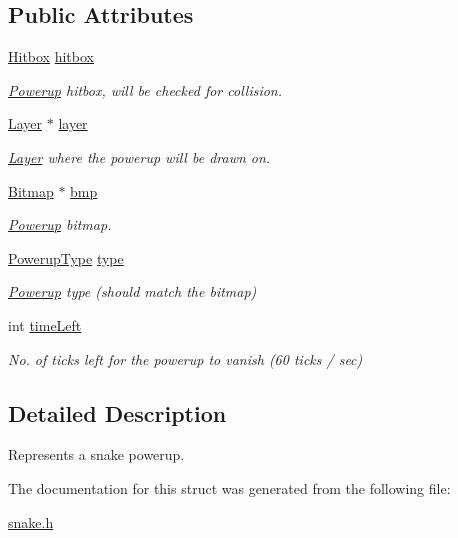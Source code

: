 \subsection*{Public Attributes}
\begin{DoxyCompactItemize}
\item 
\mbox{\hyperlink{struct_hitbox}{Hitbox}} \mbox{\hyperlink{group__snake_ga0ec1e0954c1802c16b49ff5833146f32}{hitbox}}
\begin{DoxyCompactList}\small\item\em \mbox{\hyperlink{struct_powerup}{Powerup}} hitbox, will be checked for collision. \end{DoxyCompactList}\item 
\mbox{\hyperlink{struct_layer}{Layer}} $\ast$ \mbox{\hyperlink{group__snake_ga02754983ce605c249985e650d5023797}{layer}}
\begin{DoxyCompactList}\small\item\em \mbox{\hyperlink{struct_layer}{Layer}} where the powerup will be drawn on. \end{DoxyCompactList}\item 
\mbox{\hyperlink{struct_bitmap}{Bitmap}} $\ast$ \mbox{\hyperlink{group__snake_ga13efa83c1c0242d50ed4a18a6cdc77af}{bmp}}
\begin{DoxyCompactList}\small\item\em \mbox{\hyperlink{struct_powerup}{Powerup}} bitmap. \end{DoxyCompactList}\item 
\mbox{\hyperlink{group__snake_gad58f93a5af4c0698fd0b903516c57c31}{Powerup\+Type}} \mbox{\hyperlink{group__snake_gaddc7f76821bf2505d35b85d3cf725a16}{type}}
\begin{DoxyCompactList}\small\item\em \mbox{\hyperlink{struct_powerup}{Powerup}} type (should match the bitmap) \end{DoxyCompactList}\item 
int \mbox{\hyperlink{group__snake_ga2de87d12a63bc12e8738adcada2d4ae4}{time\+Left}}
\begin{DoxyCompactList}\small\item\em No. of ticks left for the powerup to vanish (60 ticks / sec) \end{DoxyCompactList}\end{DoxyCompactItemize}


\subsection{Detailed Description}
Represents a snake powerup. 

The documentation for this struct was generated from the following file\+:\begin{DoxyCompactItemize}
\item 
\mbox{\hyperlink{snake_8h}{snake.\+h}}\end{DoxyCompactItemize}
